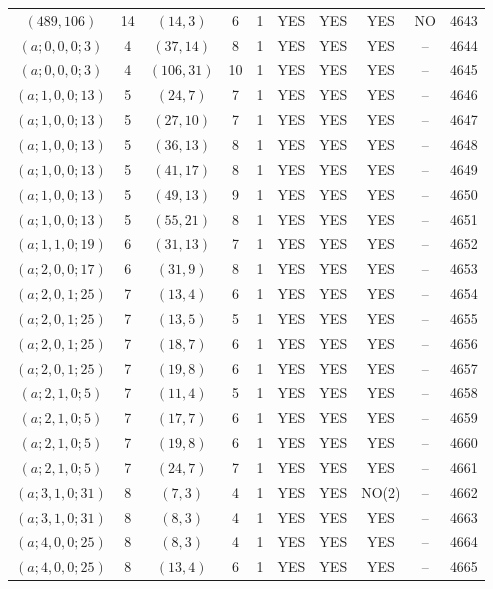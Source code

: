 \begin{longtable}{|c|c|c|c|c|c|c|c|c|c|}
$(489, 106)$ & 14 & $(14, 3)$ & 6 & 1 & YES & YES & YES & NO & 4643\\
$(a; 0, 0, 0; 3)$ & 4 & $(37, 14)$ & 8 & 1 & YES & YES & YES & -- & 4644\\
$(a; 0, 0, 0; 3)$ & 4 & $(106, 31)$ & 10 & 1 & YES & YES & YES & -- & 4645\\
$(a; 1, 0, 0; 13)$ & 5 & $(24, 7)$ & 7 & 1 & YES & YES & YES & -- & 4646\\
$(a; 1, 0, 0; 13)$ & 5 & $(27, 10)$ & 7 & 1 & YES & YES & YES & -- & 4647\\
$(a; 1, 0, 0; 13)$ & 5 & $(36, 13)$ & 8 & 1 & YES & YES & YES & -- & 4648\\
$(a; 1, 0, 0; 13)$ & 5 & $(41, 17)$ & 8 & 1 & YES & YES & YES & -- & 4649\\
$(a; 1, 0, 0; 13)$ & 5 & $(49, 13)$ & 9 & 1 & YES & YES & YES & -- & 4650\\
$(a; 1, 0, 0; 13)$ & 5 & $(55, 21)$ & 8 & 1 & YES & YES & YES & -- & 4651\\
$(a; 1, 1, 0; 19)$ & 6 & $(31, 13)$ & 7 & 1 & YES & YES & YES & -- & 4652\\
$(a; 2, 0, 0; 17)$ & 6 & $(31, 9)$ & 8 & 1 & YES & YES & YES & -- & 4653\\
$(a; 2, 0, 1; 25)$ & 7 & $(13, 4)$ & 6 & 1 & YES & YES & YES & -- & 4654\\
$(a; 2, 0, 1; 25)$ & 7 & $(13, 5)$ & 5 & 1 & YES & YES & YES & -- & 4655\\
$(a; 2, 0, 1; 25)$ & 7 & $(18, 7)$ & 6 & 1 & YES & YES & YES & -- & 4656\\
$(a; 2, 0, 1; 25)$ & 7 & $(19, 8)$ & 6 & 1 & YES & YES & YES & -- & 4657\\
$(a; 2, 1, 0; 5)$ & 7 & $(11, 4)$ & 5 & 1 & YES & YES & YES & -- & 4658\\
$(a; 2, 1, 0; 5)$ & 7 & $(17, 7)$ & 6 & 1 & YES & YES & YES & -- & 4659\\
$(a; 2, 1, 0; 5)$ & 7 & $(19, 8)$ & 6 & 1 & YES & YES & YES & -- & 4660\\
$(a; 2, 1, 0; 5)$ & 7 & $(24, 7)$ & 7 & 1 & YES & YES & YES & -- & 4661\\
$(a; 3, 1, 0; 31)$ & 8 & $(7, 3)$ & 4 & 1 & YES & YES & NO(2) & -- & 4662\\
$(a; 3, 1, 0; 31)$ & 8 & $(8, 3)$ & 4 & 1 & YES & YES & YES & -- & 4663\\
$(a; 4, 0, 0; 25)$ & 8 & $(8, 3)$ & 4 & 1 & YES & YES & YES & -- & 4664\\
$(a; 4, 0, 0; 25)$ & 8 & $(13, 4)$ & 6 & 1 & YES & YES & YES & -- & 4665\\

\end{longtable}
